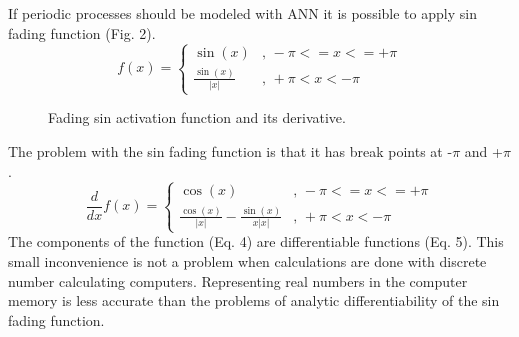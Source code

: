 \documentclass{llncs}
\begin{document}
If periodic processes should be modeled with ANN it is possible to apply sin fading function (Fig. 2).
%
\begin{equation}
f(x) = 
\left\{
	\begin{array}{ll}
		\sin(x) & \mbox{, } -\pi <= x <= +\pi \\
		\frac {\sin(x)} { |x| } & \mbox{, } +\pi < x < -\pi
	\end{array}
\right.
\end{equation}
%
\begin{figure}
    \centering
    \caption{Fading sin activation function and its derivative.}
    \label{fig:fig02}
\end{figure}
\FloatBarrier
%
The problem with the sin fading function is that it has break points at -$\pi$ and +$\pi$.
%
\begin{equation}
\frac{d}{dx}f(x) = 
\left\{
	\begin{array}{ll}
		\cos(x) & \mbox{, } -\pi <= x <= +\pi \\
		\frac {\cos(x)} { |x| } - \frac{ \sin(x) }{ x |x| } & \mbox{, } +\pi < x < -\pi
	\end{array}
\right.
\end{equation}
%
The components of the function (Eq. 4) are differentiable functions (Eq. 5). This small inconvenience is not a problem when calculations are done with discrete number calculating computers. Representing real numbers in the computer memory is less accurate than the problems of analytic differentiability of the sin fading function. 
%
\end{document}
